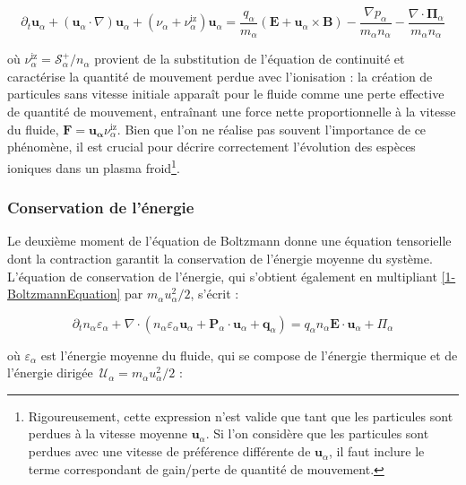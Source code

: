 \begin{refsection}
\begin{equation}
\label{1-eqMouvement}
\partial_t \mathbf{u}_\alpha + (\mathbf{u}_\alpha\cdot\nabla)\mathbf{u}_\alpha
+\left(\nu_\alpha+\nu_\alpha^\text{iz}\right) \mathbf
u_\alpha=\frac{q_\alpha}{m_\alpha}\left(\mathbf E+\mathbf u_\alpha\times \mathbf
B\right) -\frac{\nabla p_\alpha}{m_\alpha n_\alpha} -\frac{\nabla\cdot\boldsymbol{\Pi}_\alpha}{m_\alpha n_\alpha}
\end{equation}

où $\nu_\alpha^{\text{iz}}=\mathcal{S}^+_\alpha/n_\alpha$ provient de la
substitution de l'équation de continuité et caractérise la quantité de mouvement
perdue avec l'ionisation : la création de particules sans
vitesse initiale apparaît pour le fluide comme une perte effective de quantité
de mouvement, entraînant une force nette proportionnelle à la vitesse
du fluide, $\mathbf F=\mathbf{u_\alpha}
\nu_\alpha^{\text{iz}}$. Bien que l'on ne
réalise pas souvent l'importance de ce phénomène, il est crucial pour décrire
correctement l'évolution des espèces ioniques dans un plasma
froid\footnote{Rigoureusement, cette expression n'est valide que tant que les
particules sont perdues à la vitesse moyenne $\mathbf u_\alpha$.
Si l'on considère que les particules sont perdues avec une vitesse de
préférence différente de $\mathbf u_\alpha$, il faut inclure le terme
correspondant de gain/perte de quantité de mouvement.}.

\subsubsection{Conservation de l'énergie}
\label{1-ConservationEnergie}
Le deuxième moment de l'équation de Boltzmann donne une équation tensorielle
dont la contraction garantit la conservation de l'énergie moyenne du système.
L'équation de conservation de
l'énergie, qui s'obtient également en multipliant \eqref{1-BoltzmannEquation}
par $m_\alpha {u}_\alpha^2/2$, s'écrit :

\begin{equation}
\label{1-eqEnergie}
\partial_t n_\alpha\varepsilon_\alpha+
\nabla\cdot\left(n_\alpha\varepsilon_\alpha\mathbf{u}_\alpha+\mathbf
P_\alpha\cdot\mathbf{u}_\alpha + \mathbf q_\alpha\right) =q_\alpha
n_\alpha\mathbf E\cdot
\mathbf{u}_\alpha+\Pi_\alpha
\end{equation}

où $\varepsilon_\alpha$ est l'énergie
moyenne du fluide, qui se compose de l'énergie thermique et de l'énergie dirigée
$\,\mathcal{U}_{\alpha}=m_\alpha u_\alpha^2/2$ :


\end{refsection}
